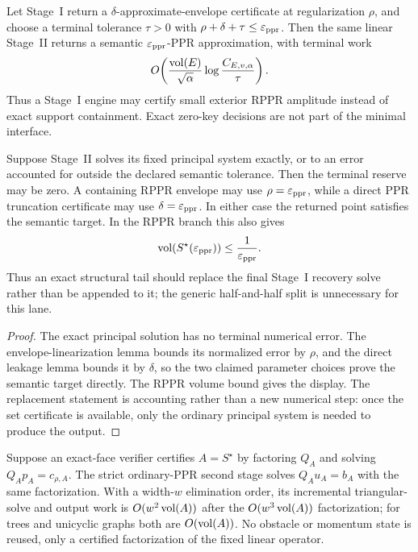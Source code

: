 \begin{corollary}
\label{cor:two-stage-three-budget}
Let Stage~I return a $\delta$-approximate-envelope certificate at
regularization $\rho$, and choose a terminal tolerance $\tau>0$ with
$\rho+\delta+\tau\leq\varepsilon_{\mathrm{ppr}}$.  Then the same linear Stage~II returns a
semantic $\varepsilon_{\mathrm{ppr}}$-PPR approximation, with terminal work
\begin{equation}
 O\!\left(
  \frac{\operatorname{vol}(E)}{\sqrt\alpha}
  \log\frac{C_{E,v,\alpha}}{\tau}
 \right).
 \label{eq:two-stage-three-budget-work}
\end{equation}
Thus a Stage~I engine may certify small exterior RPPR amplitude instead of
exact support containment.  Exact zero-key decisions are not part of the
minimal interface.
\end{corollary}

\begin{corollary}
\label{cor:two-stage-exact-tail-full-budget}
Suppose Stage~II solves its fixed principal system exactly, or to an error
accounted for outside the declared semantic tolerance.  Then the terminal
reserve may be zero.  A containing RPPR envelope may use
$\rho=\varepsilon_{\mathrm{ppr}}$, while a direct PPR truncation certificate may use
$\delta=\varepsilon_{\mathrm{ppr}}$.  In either case the returned point satisfies the semantic
target.  In the RPPR branch this also gives
\begin{equation*}
 \operatorname{vol}(S^\star(\varepsilon_{\mathrm{ppr}}))\leq\frac1{\varepsilon_{\mathrm{ppr}}}.
\end{equation*}
Thus an exact structural tail should replace the final Stage~I recovery
solve rather than be appended to it; the generic half-and-half split is
unnecessary for this lane.
\end{corollary}

\begin{proof}
The exact principal solution has no terminal numerical error.  The
envelope-linearization lemma bounds its normalized error by $\rho$, and the
direct leakage lemma bounds it by $\delta$, so the two claimed parameter
choices prove the semantic target directly.  The RPPR volume bound gives the
display.
The replacement statement is accounting rather than a new numerical step:
once the set certificate is available, only the ordinary principal system is
needed to produce the output.
\end{proof}

\begin{corollary}
\label{cor:two-stage-factor-reuse}
Suppose an exact-face verifier certifies $A=S^\star$ by factoring $Q_A$ and
solving $Q_Ap_A=c_{\rho,A}$.  The strict ordinary-PPR second stage solves
$Q_Au_A=b_A$ with the same factorization.  With a width-$w$ elimination
order, its incremental triangular-solve and output work is
$O(w^2\operatorname{vol}(A))$ after the $O(w^3\operatorname{vol}(A))$ factorization; for trees and
unicyclic graphs both are $O(\operatorname{vol}(A))$.  No obstacle or momentum state is
reused, only a certified factorization of the fixed linear operator.
\end{corollary}

